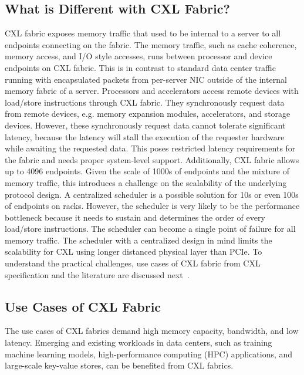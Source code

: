 \subsection{What is Different with CXL Fabric?}
CXL fabric exposes memory traffic that used to be internal to a server to all endpoints connecting on the fabric. 
%
The memory traffic, such as cache coherence, memory access, and I/O style accesses, runs between processor and device endpoints on CXL fabric.
%
This is in contrast to standard data center traffic running with encapsulated packets from per-server NIC outside of the internal memory fabric of a server.
%
Processors and accelerators access remote devices with load/store instructions through CXL fabric.
%
They synchronously request data from remote devices, e.g. memory expansion modules, accelerators, and storage devices. 
%
However, these synchronously request data cannot tolerate significant latency, because the latency will 
stall the execution of the requester hardware while awaiting the requested data.
%
This poses restricted latency requirements for the fabric and needs proper system-level support. 
%
Additionally, CXL fabric allows up to 4096 endpoints.
%
Given the scale of 1000s of endpoints and the mixture of memory traffic,
this introduces a challenge on the scalability of the underlying protocol design.
%
A centralized scheduler is a possible solution for 10s or even 100s of endpoints on racks.
%
However, the scheduler is very likely to be the performance bottleneck because it needs to sustain and determines the order of every load/store instructions.
%
The scheduler can become a single point of failure for all memory traffic.
%
The scheduler with a centralized design in mind limits the scalability for CXL using longer distanced physical layer than PCIe.
%
To understand the practical challenges, use cases of CXL fabric from CXL specification and the literature are discussed next~\cite{cxl-3-0-spec, directcxl:atc:2022, pond:asplos:2023}. 
%

\subsection{Use Cases of CXL Fabric}

The use cases of CXL fabrics demand high memory capacity, bandwidth, and low latency.
%
Emerging and existing workloads in data centers, such as training machine learning models, high-performance computing (HPC) applications, and large-scale key-value stores, can be benefited from CXL fabrics.   

